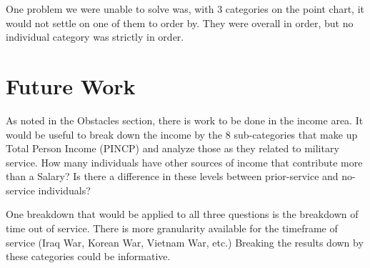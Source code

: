 \documentclass{article}
\begin{document}
One problem we were unable to solve was, with 3 categories on the point chart, it would not settle on one of them to order by. They were overall in order, but no individual category was strictly in order.


\section{Future Work}
As noted in the Obstacles section, there is work to be done in the income area. It would be useful to break down the income by the 8 sub-categories that make up Total Person Income (PINCP) and analyze those as they related to military service. How many individuals have other sources of income that contribute more than a Salary? Is there a difference in these levels between prior-service and no-service individuals?

One breakdown that would be applied to all three questions is the breakdown of time out of service. There is more granularity available for the timeframe of service (Iraq War, Korean War, Vietnam War, etc.) Breaking the results down by these categories could be informative. 
\end{document}
